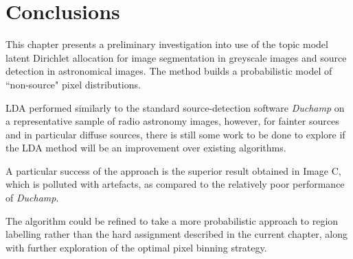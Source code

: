 \section{Conclusions}

This chapter presents a preliminary investigation into use of the topic model latent Dirichlet allocation for image segmentation in greyscale images and source detection in astronomical images. The method builds a probabilistic model of ``non-source" pixel distributions.

LDA performed similarly to the standard source-detection software \emph{Duchamp} \protect\cite{whiting2012duchamp} on a representative sample of radio astronomy images, however, for fainter sources and in particular diffuse sources, there is still some work to be done to explore if the LDA method will be an improvement over existing algorithms.

A particular success of the approach is the superior result obtained in Image C, which is polluted with artefacts, as compared to the relatively poor performance of \emph{Duchamp}.

The algorithm could be refined to take a more probabilistic approach to region labelling rather than the hard assignment described in the current chapter, along with further exploration of the optimal pixel binning strategy.




